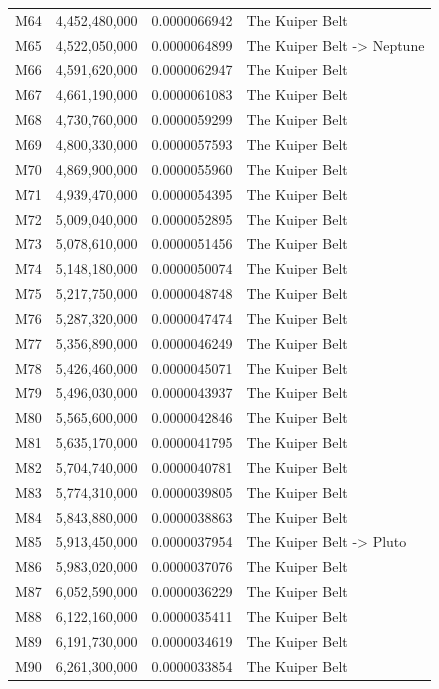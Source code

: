 \documentclass[11pt, a4paper]{article}
\begin{document}
\begin{longtable}{@{} c c c l @{}}
  M64 & 4,452,480,000 & 0.0000066942 & The Kuiper Belt \\
  M65 & 4,522,050,000 & 0.0000064899 & The Kuiper Belt -> Neptune \\
  M66 & 4,591,620,000 & 0.0000062947 & The Kuiper Belt \\
  M67 & 4,661,190,000 & 0.0000061083 & The Kuiper Belt \\
  M68 & 4,730,760,000 & 0.0000059299 & The Kuiper Belt \\
  M69 & 4,800,330,000 & 0.0000057593 & The Kuiper Belt \\
  M70 & 4,869,900,000 & 0.0000055960 & The Kuiper Belt \\
  M71 & 4,939,470,000 & 0.0000054395 & The Kuiper Belt \\
  M72 & 5,009,040,000 & 0.0000052895 & The Kuiper Belt \\
  M73 & 5,078,610,000 & 0.0000051456 & The Kuiper Belt \\
  M74 & 5,148,180,000 & 0.0000050074 & The Kuiper Belt \\
  M75 & 5,217,750,000 & 0.0000048748 & The Kuiper Belt \\
  M76 & 5,287,320,000 & 0.0000047474 & The Kuiper Belt \\
  M77 & 5,356,890,000 & 0.0000046249 & The Kuiper Belt \\
  M78 & 5,426,460,000 & 0.0000045071 & The Kuiper Belt \\
  M79 & 5,496,030,000 & 0.0000043937 & The Kuiper Belt \\
  M80 & 5,565,600,000 & 0.0000042846 & The Kuiper Belt \\
  M81 & 5,635,170,000 & 0.0000041795 & The Kuiper Belt \\
  M82 & 5,704,740,000 & 0.0000040781 & The Kuiper Belt \\
  M83 & 5,774,310,000 & 0.0000039805 & The Kuiper Belt \\
  M84 & 5,843,880,000 & 0.0000038863 & The Kuiper Belt \\
  M85 & 5,913,450,000 & 0.0000037954 & The Kuiper Belt -> Pluto \\
  M86 & 5,983,020,000 & 0.0000037076 & The Kuiper Belt \\
  M87 & 6,052,590,000 & 0.0000036229 & The Kuiper Belt \\
  M88 & 6,122,160,000 & 0.0000035411 & The Kuiper Belt \\
  M89 & 6,191,730,000 & 0.0000034619 & The Kuiper Belt \\
  M90 & 6,261,300,000 & 0.0000033854 & The Kuiper Belt \\

\end{longtable}
\end{document}
